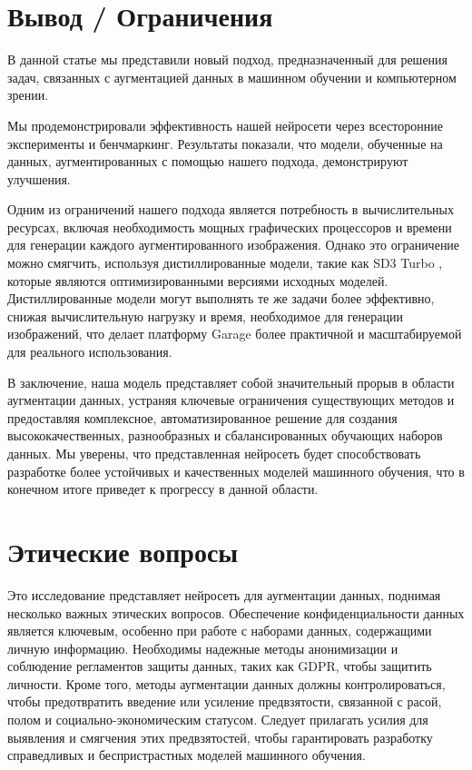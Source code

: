 \documentclass[11pt]{article}
\begin{document}
\section{Вывод / Ограничения}

В данной статье мы представили новый подход, предназначенный для решения задач, связанных с аугментацией данных в машинном обучении и компьютерном зрении.

Мы продемонстрировали эффективность нашей нейросети через всесторонние эксперименты и бенчмаркинг. Результаты показали, что модели, обученные на данных, аугментированных с помощью нашего подхода, демонстрируют улучшения. 


Одним из ограничений нашего подхода является потребность в вычислительных ресурсах, включая необходимость мощных графических процессоров и времени для генерации каждого аугментированного изображения. Однако это ограничение можно смягчить, используя дистиллированные модели, такие как SD3 Turbo \cite{sauer2024fast}, которые являются оптимизированными версиями исходных моделей. Дистиллированные модели могут выполнять те же задачи более эффективно, снижая вычислительную нагрузку и время, необходимое для генерации изображений, что делает платформу Garage более практичной и масштабируемой для реального использования.

В заключение, наша модель представляет собой значительный прорыв в области аугментации данных, устраняя ключевые ограничения существующих методов и предоставляя комплексное, автоматизированное решение для создания высококачественных, разнообразных и сбалансированных обучающих наборов данных. Мы уверены, что представленная нейросеть будет способствовать разработке более устойчивых и качественных моделей машинного обучения, что в конечном итоге приведет к прогрессу в данной области.

\section{Этические вопросы}
Это исследование представляет нейросеть для аугментации данных, поднимая несколько важных этических вопросов. Обеспечение конфиденциальности данных является ключевым, особенно при работе с наборами данных, содержащими личную информацию. Необходимы надежные методы анонимизации и соблюдение регламентов защиты данных, таких как GDPR, чтобы защитить личности. Кроме того, методы аугментации данных должны контролироваться, чтобы предотвратить введение или усиление предвзятости, связанной с расой, полом и социально-экономическим статусом. Следует прилагать усилия для выявления и смягчения этих предвзятостей, чтобы гарантировать разработку справедливых и беспристрастных моделей машинного обучения.
\end{document}
